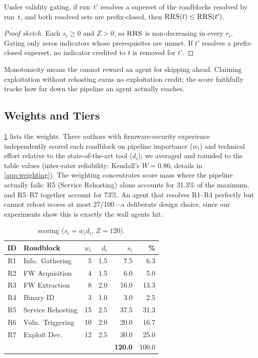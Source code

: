 \begin{proposition}
\label{prop:monotone}
Under validity gating, if run~$t'$ resolves a superset of the roadblocks resolved by run~$t$, and both resolved sets are prefix-closed, then $\textsc{RRS}(t)\le \textsc{RRS}(t')$.
\end{proposition}
\begin{proof}[Proof sketch]
Each $s_i\ge 0$ and $Z>0$, so $\textsc{RRS}$ is non-decreasing in every $r_i$. Gating only zeros indicators whose prerequisites are unmet. If $t'$ resolves a prefix-closed superset, no indicator credited to $t$ is removed for $t'$.
\end{proof}

Monotonicity means the \rrs cannot reward an agent for skipping ahead. Claiming exploitation without rehosting earns no exploitation credit; the score faithfully tracks how far down the pipeline an agent actually reaches.

\subsection{Weights and Tiers}

\cref{tab:scoring} lists the weights. Three authors with firmware-security experience independently scored each roadblock on pipeline importance ($w_i$) and technical effort relative to the state-of-the-art tool ($d_i$); we averaged and rounded to the table values (inter-rater reliability: Kendall's $W=0.86$; details in \cref{app:weighting}). The weighting concentrates score mass where the pipeline actually fails: R5 (Service Rehosting) alone accounts for 31.3\% of the maximum, and R5--R7 together account for 73\%. An agent that resolves R1--R4 perfectly but cannot rehost scores at most 27/100---a deliberate design choice, since our experiments show this is exactly the wall agents hit.

\begin{table}[t]
    \centering
    \caption{\rrs scoring ($s_i=w_i d_i$, $Z=120$).}
    \label{tab:scoring}
    \small
    \begin{tabular}{clrrrr}
        \toprule
        \textbf{ID} & \textbf{Roadblock} & \textbf{$w_i$} & \textbf{$d_i$} & \textbf{$s_i$} & \textbf{\%} \\
        \midrule
        R1 & Info.\ Gathering        & 5  & 1.5  & 7.5   & 6.3 \\
        R2 & FW Acquisition          & 4  & 1.5  & 6.0   & 5.0 \\
        R3 & FW Extraction           & 8  & 2.0  & 16.0  & 13.3 \\
        R4 & Binary ID              & 3  & 1.0  & 3.0   & 2.5 \\
        R5 & Service Rehosting       & 15 & 2.5  & 37.5  & 31.3 \\
        R6 & Vuln.\ Triggering       & 10 & 2.0  & 20.0  & 16.7 \\
        R7 & Exploit Dev.\          & 12 & 2.5  & 30.0  & 25.0 \\
        \midrule
        \multicolumn{4}{l}{} & \textbf{120.0} & 100.0 \\
        \bottomrule
    \end{tabular}
\end{table}

